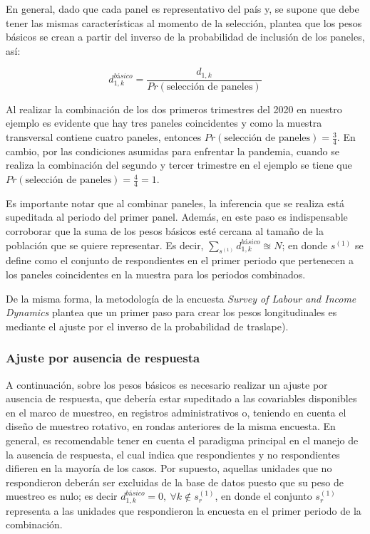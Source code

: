 \documentclass[
  12pt,
  spanish,
]{book}
\begin{document}
En general, dado que cada panel es representativo del país y, se supone que debe tener las mismas características al momento de la selección, \citet{LaRoche_2003} plantea que los pesos básicos se crean a partir del inverso de la probabilidad de inclusión de los paneles, así:

\[
d_{1, k}^{básico} = \frac{d_{1, k}}{Pr(\text{selección de paneles})}
\]

Al realizar la combinación de los dos primeros trimestres del 2020 en nuestro ejemplo es evidente que hay tres paneles coincidentes y como la muestra transversal contiene cuatro paneles, entonces \(Pr(\text{selección de paneles}) = \frac{3}{4}\). En cambio, por las condiciones asumidas para enfrentar la pandemia, cuando se realiza la combinación del segundo y tercer trimestre en el ejemplo se tiene que \(Pr(\text{selección de paneles}) = \frac{4}{4} = 1\).

Es importante notar que al combinar paneles, la inferencia que se realiza está supeditada al periodo del primer panel. Además, en este paso es indispensable corroborar que la suma de los pesos básicos esté cercana al tamaño de la población que se quiere representar. Es decir, \(\sum_{s^{(1)}} d_{1, k}^{básico} \approxeq N\); en donde \(s^{(1)}\) se define como el conjunto de respondientes en el primer periodo que pertenecen a los paneles coincidentes en la muestra para los periodos combinados.

De la misma forma, la metodología de la
encuesta \emph{Survey of Labour and Income Dynamics} \citep{Naud_2002, LaRoche_2003} plantea que un primer paso para crear los pesos longitudinales es mediante el ajuste por el inverso de la probabilidad de traslape).

\hypertarget{ajuste-por-ausencia-de-respuesta-1}{%
\subsubsection{Ajuste por ausencia de respuesta}\label{ajuste-por-ausencia-de-respuesta-1}}

A continuación, sobre los pesos básicos es necesario realizar un ajuste por ausencia de respuesta, que debería estar supeditado a las covariables disponibles en el marco de muestreo, en registros administrativos o, teniendo en cuenta el diseño de muestreo rotativo, en rondas anteriores de la misma encuesta. En general, es recomendable tener en cuenta el paradigma principal en el manejo de la ausencia de respuesta, el cual indica que respondientes y no respondientes difieren en la mayoría de los casos. Por supuesto, aquellas unidades que no respondieron deberán ser excluidas de la base de datos puesto que su peso de muestreo es nulo; es decir \(d_{1, k}^{básico} = 0, \ \forall k \notin s_r^{(1)}\), en donde el conjunto \(s_r^{(1)}\) representa a las unidades que respondieron la encuesta en el primer periodo de la combinación.
\end{document}

